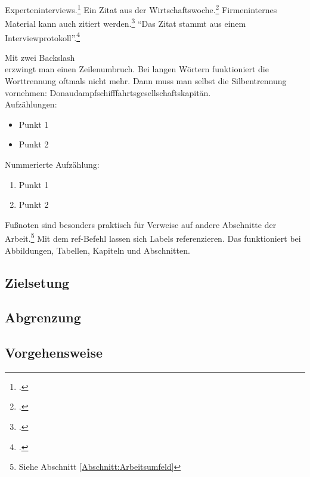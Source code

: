 Experteninterviews.\footcite[Vgl.][S. 7]{Meuser2009} Ein Zitat aus der Wirtschaftswoche.\footcite[Vgl.][S. 32]{WIWO2018}
Firmeninternes Material kann auch zitiert werden.\footcite[Vgl.][]{Firma2018} "`Das Zitat stammt aus einem Interviewprotokoll"'.\footcite{Experte2018}

Mit zwei Backslash \\ erzwingt man einen Zeilenumbruch. Bei langen Wörtern funktioniert die Worttrennung oftmals nicht mehr.
Dann muss man selbst die Silbentrennung vornehmen: Donau\-dampf\-schiff\-fahrts\-gesell\-schafts\-kapitän. \\
Aufzählungen:
\begin{itemize}
  \item Punkt 1
  \item Punkt 2
\end{itemize}
Nummerierte Aufzählung:
\begin{enumerate}
  \item Punkt 1
  \item Punkt 2
\end{enumerate}

Fußnoten sind besonders praktisch für Verweise auf andere Abschnitte der Arbeit.\footnote{Siehe Abschnitt \ref{Abschnitt:Arbeitsumfeld}} 
Mit dem ref-Befehl lassen sich Labels referenzieren. Das funktioniert bei Abbildungen, Tabellen, Kapiteln und Abschnitten.

\subsection{Zielsetung}
\subsection{Abgrenzung}
\subsection{Vorgehensweise}